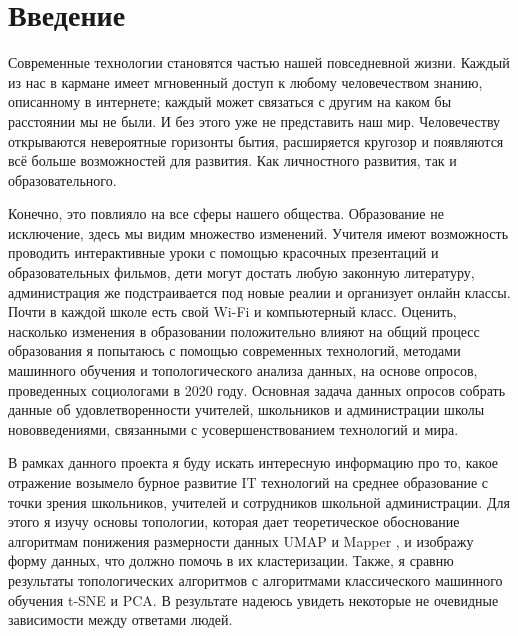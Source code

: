 \section{Введение} \label{sec:intro}

Современные технологии становятся частью нашей повседневной жизни. 
Каждый из нас в кармане имеет мгновенный доступ к любому человечеством знанию, описанному в интернете; каждый может связаться с другим на каком бы расстоянии мы не были. И без этого уже не представить наш мир. 
Человечеству открываются невероятные горизонты бытия, расширяется кругозор и появляются всё больше возможностей для развития. 
Как личностного развития, так и образовательного. 

Конечно, это повлияло на все сферы нашего общества. 
Образование не исключение, здесь мы видим множество изменений. 
Учителя имеют возможность проводить интерактивные уроки с помощью красочных презентаций и образовательных фильмов, дети могут достать любую законную литературу, администрация же подстраивается под новые реалии и организует онлайн классы. 
Почти в каждой школе есть свой Wi-Fi и компьютерный класс. 
Оценить, насколько изменения в образовании положительно влияют на общий процесс образования я попытаюсь с помощью современных технологий, методами машинного обучения и топологического анализа данных, на основе опросов, проведенных социологами в 2020 году. 
Основная задача данных опросов собрать данные об удовлетворенности учителей, школьников и администрации школы нововведениями, связанными с усовершенствованием технологий и мира.

В рамках данного проекта я буду искать интересную информацию про то, какое отражение возымело бурное развитие IT технологий на среднее образование с точки зрения школьников, учителей и сотрудников школьной администрации.
Для этого я изучу основы топологии, которая дает теоретическое обоснование алгоритмам понижения размерности данных UMAP \cite{umap} и Mapper \cite{mapper}, и изображу форму данных, что должно помочь в их кластеризации.
Также, я сравню результаты топологических алгоритмов с алгоритмами классического машинного обучения t-SNE \cite{tsne} и PCA.
В результате надеюсь увидеть некоторые не очевидные зависимости между ответами людей.


